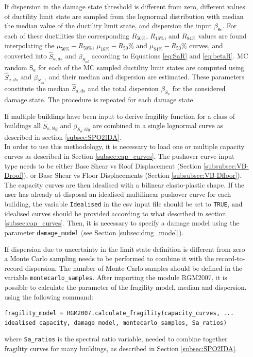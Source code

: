 If dispersion in the damage state threshold is different from zero, different values of ductility limit state are sampled from the lognormal distribution with median the median value of the ductility limit state, and dispersion the input $\beta_{\theta c}$. For each of these ductilities the corresponding $R_{50\%}$, $R_{16\%}$, and $R_{84\%}$ values are found interpolating the $\mu_{50\%}-R_{50\%}$, $\mu_{16\%}-R_50\%$ and $\mu_{84\%}-R_50\%$ curves, and converted into $\hat{S}_{a,ds}$ and $\beta_{S_{a d}}$ according to Equations \ref{eq:SaR} and \ref{eq:betaR}. MC random S$_a$ for each of the MC sampled ductility limit states are computed using $\hat{S}_{a,ds}$ and $\beta_{S_{a d}}$, and their median and dispersion are estimated. These parameters constitute the median $\hat{S}_{a,ds}$ and the total dispersion $\beta_{S_a}$ for the considered damage state. The procedure is repeated for each damage state.

If multiple buildings have been input to derive fragility function for a class of buildings all $\hat{S}_{a, blg}$ and $\beta_{S_a, blg}$ are combined in a single lognormal curve as described in section \ref{subsec:SPO2IDA}.\\

In order to use this methodology, it is necessary to load one or multiple capacity curves as described in Section \ref{subsec:cap_curves}. The pushover curve input type needs to be either Base Shear vs Roof Displacement (Section \ref{subsubsec:VB-Droof}), or Base Shear vs Floor Displacements (Section \ref{subsubsec:VB-Dfloor}). The capacity curves are then idealised with a bilinear elasto-plastic shape. If the user has already at disposal an idealised multilinear pushover curve for each building, the variable \verb=Idealised= in the csv input file should be set to \verb=TRUE=, and idealised curves should be provided according to what described in section \ref{subsec:cap_curves}. Then, it is necessary to specify a damage model using the parameter \verb=damage_model= (see Section \ref{subsec:dmg_model}).

If dispersion due to uncertainty in the limit state definition is different from zero a Monte Carlo sampling needs to be performed to combine it with the record-to-record dispersion. The number of Monte Carlo samples should be defined in the variable \verb=montecarlo_samples=.
After importing the module RGM2007, it is possible to calculate the parameter of the fragility model, median and dispersion, using the following command:

\begin{Verbatim}[frame=single, commandchars=\\\{\}, samepage=true]
fragility_model = RGM2007.calculate_fragility(capacity_curves, ...
idealised_capacity, damage_model, montecarlo_samples, Sa_ratios)
\end{Verbatim}

where \verb=Sa_ratios= is the spectral ratio variable, needed to combine together fragility curves for many buildings, as described in Section \ref{subsec:SPO2IDA}.